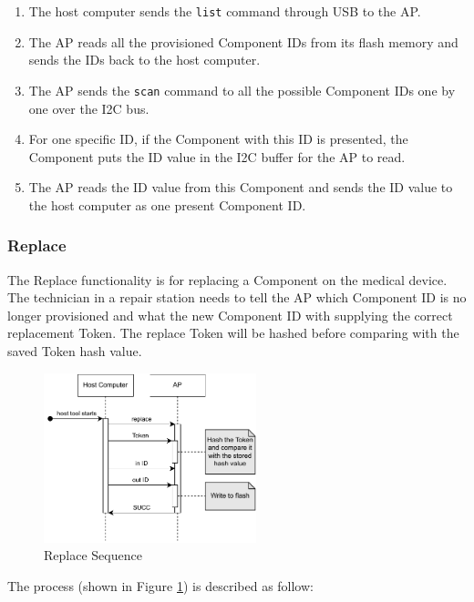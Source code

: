 \documentclass[11pt,oneside,onecolumn,letterpaper]{article}
\begin{document}
\begin{enumerate}
	\item The host computer sends the \texttt{list} command through USB to the AP.
	\item The AP reads all the provisioned Component IDs from its flash memory and sends the IDs back to the host computer.
	\item The AP sends the \texttt{scan} command to all the possible Component IDs one by one over the I2C bus.
	\item For one specific ID,
	if the Component with this ID is presented,
	the Component puts the ID value in the I2C buffer for the AP to read.
	\item The AP reads the ID value from this Component and sends the ID value to the host computer as one present Component ID.
	
\end{enumerate}

\subsubsection{Replace}
The Replace functionality is for replacing a Component on the medical device.
The technician in a repair station needs to tell the AP which Component ID is no longer provisioned and what the new Component ID with supplying the correct replacement Token.
The replace Token will be hashed before comparing with the saved Token hash value.

\begin{figure}[h]
	\centering
	\includegraphics[width=0.55\textwidth]{pics/replace.pdf}
	\caption{Replace Sequence}
	\label{fig:functionality_replace}
\end{figure}

The process (shown in Figure \ref{fig:functionality_replace}) is described as follow:
\end{document}
